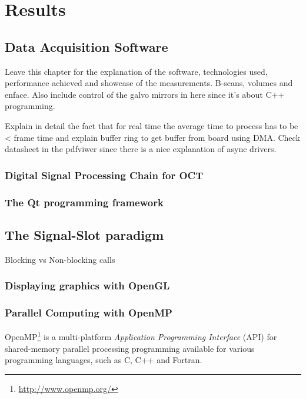 
\chapter{Results} %
\label{ch:results} %


\section{Data Acquisition Software}
Leave this chapter for the explanation of the software, technologies used, performance achieved and showcase of the measurements. B-scans, volumes and enface. Also include control of the galvo mirrors in here since it's about C++ programming. 

Explain in detail the fact that for real time the average time to process has to be < frame time and explain buffer ring to get buffer from board using DMA. Check datasheet in the pdfviwer since there is a nice explanation of async drivers. 


\subsection{Digital Signal Processing Chain for OCT}

\subsection{The Qt programming framework}
	\section{The Signal-Slot paradigm}
    Blocking vs Non-blocking calls

\subsection{Displaying graphics with OpenGL}

\subsection{Parallel Computing with OpenMP}
OpenMP\footnote{\url{http://www.openmp.org/}}  is a multi-platform \emph{Application Programming Interface} (API) for shared-memory parallel processing programming available for various programming languages, such as C, C++ and Fortran. 




